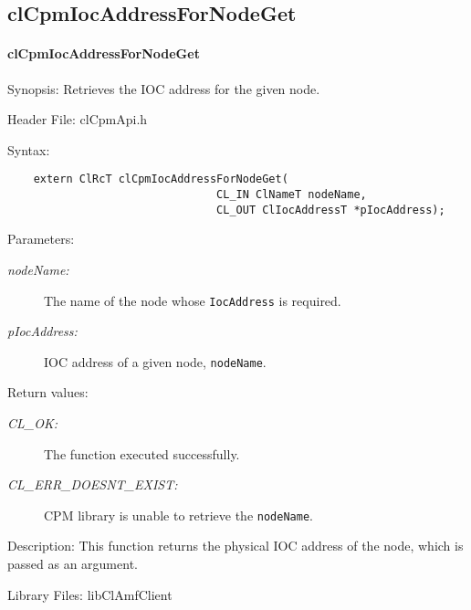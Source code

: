 {\newpage





\subsection{clCpmIocAddressForNodeGet}
\hypertarget{pagecpm204}{}\paragraph{cl\-Cpm\-Ioc\-Address\-For\-Node\-Get}\label{pagecpm204}
\begin{Desc}
\item[Synopsis:]Retrieves the IOC address for the given node.\end{Desc}
\begin{Desc}
\item[Header File:]clCpmApi.h\end{Desc}
\begin{Desc}
\item[Syntax:]

\footnotesize\begin{verbatim}    extern ClRcT clCpmIocAddressForNodeGet(
                      			CL_IN ClNameT nodeName,
                      			CL_OUT ClIocAddressT *pIocAddress);
\end{verbatim}
\normalsize
\end{Desc}
\begin{Desc}
\item[Parameters:]
\begin{description}
\item[{\em node\-Name:}]The name of the node whose {\tt{Ioc\-Address}} is required.
\item[{\em p\-Ioc\-Address:}]IOC address of a given node, {\tt{node\-Name}}.\end{description}
\end{Desc}
\begin{Desc}
\item[Return values:]
\begin{description}
\item[{\em CL\_\-OK:}]The function executed successfully. 
\item[{\em CL\_\-ERR\_\-DOESNT\_\-EXIST:}]CPM library is unable to retrieve the {\tt{nodeName}}.\end{description}
\end{Desc}
\begin{Desc}
\item[Description:]This function returns the physical IOC address of the node, which is passed as an argument.\end{Desc}
\begin{Desc}
\item[Library Files:]lib\-Cl\-Amf\-Client\end{Desc}

}
